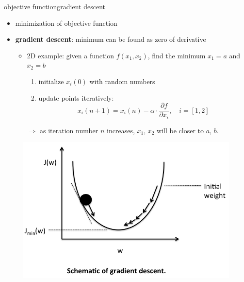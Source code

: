         \begin{frame}{objective function}{gradient descent}
            \begin{itemize}
                \item   minimization of objective function

               \bigskip
            \item<2->  \textbf{gradient descent}: minimum can be found as zero of derivative
                       \begin{itemize}
                            \item  2D example: given a function $f(x_{1}, x_{2})$, find the minimum $x_{1} = a$ and $x_{2} = b$
                                \smallskip
                                \begin{enumerate}
                                    \item  initialize $x_{i}(0)$ with random numbers
                                    \item  update points iteratively:  
                                             \begin{equation*}
                                                 x_{i}(n+1) = x_{i}(n) - \alpha \cdot \frac{\partial f}{\partial x_{i}}, \quad i = [1, 2]
                                             \end{equation*}
                                \end{enumerate}
                            \bigskip
                            \item[$\Rightarrow$] as iteration number $n$ increases, $x_{1}$, $x_{2}$ will be closer to $a$, $b$.
                       \end{itemize}			   			   
            \end{itemize}
            \vspace{-2mm}
            \begin{figure}
                \includegraphics[scale=.2]{graph/gradient_descent}
            \end{figure}
        \end{frame}    
          

